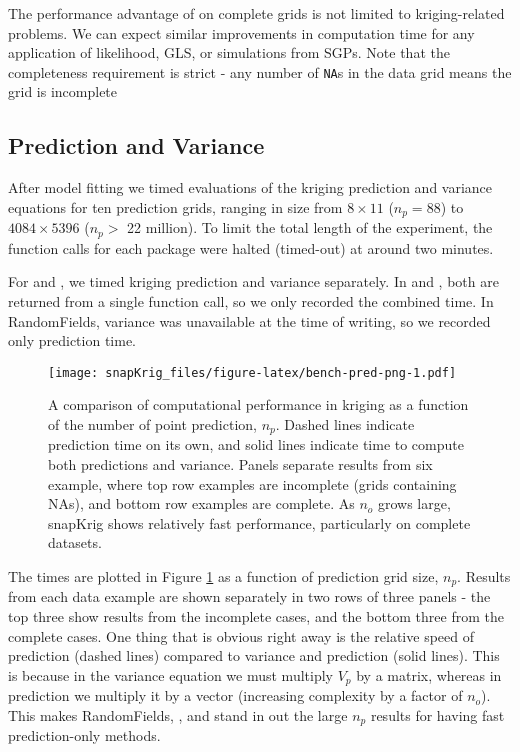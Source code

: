 The performance advantage of  on complete grids is not limited to kriging-related problems. We can expect similar improvements in computation time for any application of likelihood, GLS, or simulations from SGPs. Note that the completeness requirement is strict - any number of \texttt{NA}s in the data grid means the grid is incomplete

\hypertarget{prediction-and-variance}{%
\subsection{Prediction and Variance}\label{prediction-and-variance}}

After model fitting we timed evaluations of the kriging prediction and variance equations for ten prediction grids, ranging in size from \(8 \times 11\) (\(n_p=88\)) to \(4084 \times 5396\) (\(n_p>\) 22 million). To limit the total length of the experiment, the function calls for each package were halted (timed-out) at around two minutes.

For  and , we timed kriging prediction and variance separately. In  and , both are returned from a single function call, so we only recorded the combined time. In RandomFields, variance was unavailable at the time of writing, so we recorded only prediction time.

\begin{figure}
\centering
\texttt{[image: snapKrig\_files/figure-latex/bench-pred-png-1.pdf]}
\caption{\label{fig:bench-pred-png}A comparison of computational performance in kriging as a function of the number of point prediction, \(n_p\). Dashed lines indicate prediction time on its own, and solid lines indicate time to compute both predictions and variance. Panels separate results from six example, where top row examples are incomplete (grids containing NAs), and bottom row examples are complete. As \(n_o\) grows large, snapKrig shows relatively fast performance, particularly on complete datasets.}
\end{figure}

The times are plotted in Figure \ref{fig:bench-pred-png} as a function of prediction grid size, \(n_p\). Results from each data example are shown separately in two rows of three panels - the top three show results from the incomplete cases, and the bottom three from the complete cases. One thing that is obvious right away is the relative speed of prediction (dashed lines) compared to variance and prediction (solid lines). This is because in the variance equation we must multiply \(V_p\) by a matrix, whereas in prediction we multiply it by a vector (increasing complexity by a factor of \(n_o\)). This makes RandomFields, , and  stand in out the large \(n_p\) results for having fast prediction-only methods.

